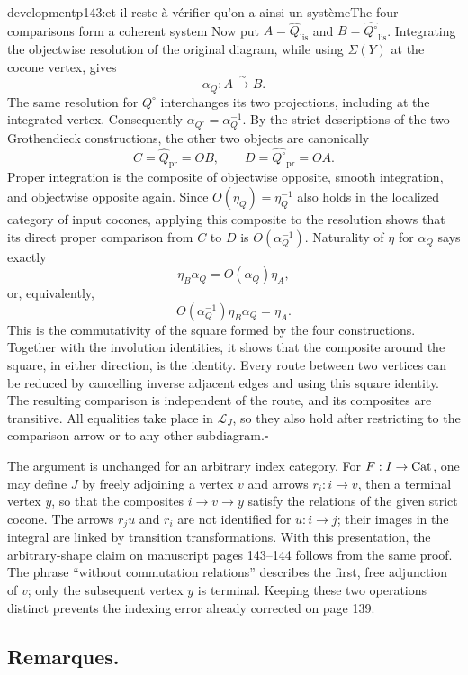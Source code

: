\begin{dcomment}{development}{p143:et il reste à vérifier qu'on a ainsi un système}{The four comparisons form a coherent system}
Now put $A=\widehat Q_{\mathrm{lis}}$ and $B=\widehat{Q^\circ}_{\mathrm{lis}}$. Integrating the objectwise resolution of the original diagram, while using $\Sigma(Y)$ at the cocone vertex, gives
\[
 \alpha_Q:A\xrightarrow{\sim}B.
\]
The same resolution for $Q^\circ$ interchanges its two projections, including at the integrated vertex. Consequently $\alpha_{Q^\circ}=\alpha_Q^{-1}$. By the strict descriptions of the two Grothendieck constructions, the other two objects are canonically
\[
 C=\widehat Q_{\mathrm{pr}}=OB,
 \qquad D=\widehat{Q^\circ}_{\mathrm{pr}}=OA.
\]
Proper integration is the composite of objectwise opposite, smooth integration, and objectwise opposite again. Since $O(\eta_Q)=\eta_Q^{-1}$ also holds in the localized category of input cocones, applying this composite to the resolution shows that its direct proper comparison from $C$ to $D$ is $O(\alpha_Q^{-1})$. Naturality of $\eta$ for $\alpha_Q$ says exactly
\[
 \eta_B\alpha_Q=O(\alpha_Q)\eta_A,
\]
or, equivalently,
\[
 O(\alpha_Q^{-1})\eta_B\alpha_Q=\eta_A.
\]
This is the commutativity of the square formed by the four constructions. Together with the involution identities, it shows that the composite around the square, in either direction, is the identity. Every route between two vertices can be reduced by cancelling inverse adjacent edges and using this square identity. The resulting comparison is independent of the route, and its composites are transitive. All equalities take place in $\mathcal L_J$, so they also hold after restricting to the comparison arrow or to any other subdiagram.\hfill$\square$

The argument is unchanged for an arbitrary index category. For $F:I\to\mathrm{Cat}$, one may define $J$ by freely adjoining a vertex $v$ and arrows $r_i:i\to v$, then a terminal vertex $y$, so that the composites $i\to v\to y$ satisfy the relations of the given strict cocone. The arrows $r_j u$ and $r_i$ are not identified for $u:i\to j$; their images in the integral are linked by transition transformations. With this presentation, the arbitrary-shape claim on manuscript pages 143--144 follows from the same proof. The phrase ``without commutation relations'' describes the first, free adjunction of $v$; only the subsequent vertex $y$ is terminal. Keeping these two operations distinct prevents the indexing error already corrected on page 139.
\end{dcomment}


\subsection*{Remarques.}

